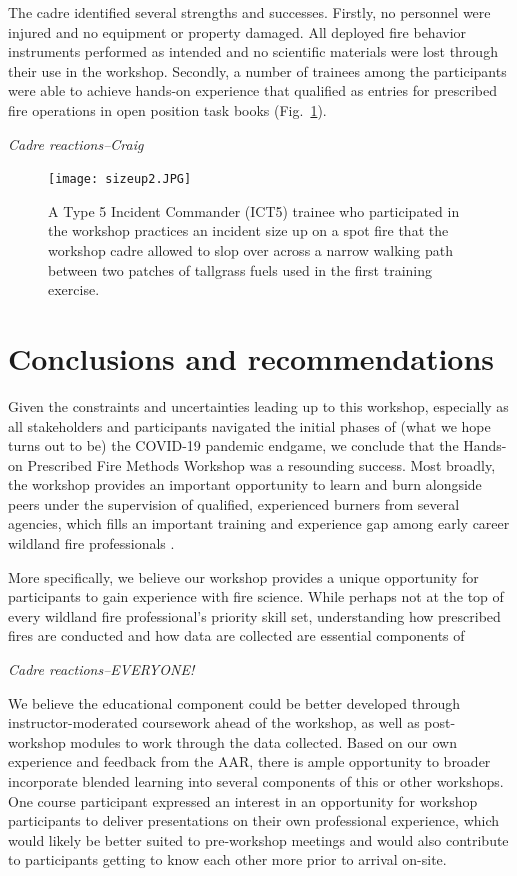 \documentclass[fire,article,submit,moreauthors,pdftex]{Definitions/mdpi}
\begin{document}
The cadre identified several strengths and successes.
Firstly, no personnel were injured and no equipment or property damaged.
All deployed fire behavior instruments performed as intended and no scientific materials were lost through their use in the workshop.
Secondly, a number of trainees among the participants were able to achieve hands-on experience that qualified as entries for prescribed fire operations in open position task books (Fig.~\ref{sizeup}).

\emph{Cadre reactions--Craig}

\begin{figure}
\centering
\texttt{[image: sizeup2.JPG]}
\caption{A Type 5 Incident Commander (ICT5) trainee who participated in the workshop practices an incident size up on a spot fire that the workshop cadre allowed to slop over across a narrow walking path between two patches of tallgrass fuels used in the first training exercise. \label{sizeup}}
\end{figure}

\hypertarget{conclusions-and-recommendations}{%
\section{Conclusions and recommendations}\label{conclusions-and-recommendations}}

Given the constraints and uncertainties leading up to this workshop, especially as all stakeholders and participants navigated the initial phases of (what we hope turns out to be) the COVID-19 pandemic endgame, we conclude that the Hands-on Prescribed Fire Methods Workshop was a resounding success.
Most broadly, the workshop provides an important opportunity to learn and burn alongside peers under the supervision of qualified, experienced burners from several agencies, which fills an important training and experience gap among early career wildland fire professionals \citep{kobziar2009}.

More specifically, we believe our workshop provides a unique opportunity for participants to gain experience with fire science.
While perhaps not at the top of every wildland fire professional's priority skill set, understanding how prescribed fires are conducted and how data are collected are essential components of

\emph{Cadre reactions--EVERYONE!}

We believe the educational component could be better developed through instructor-moderated coursework ahead of the workshop, as well as post-workshop modules to work through the data collected.
Based on our own experience and feedback from the AAR, there is ample opportunity to broader incorporate blended learning into several components of this or other workshops.
One course participant expressed an interest in an opportunity for workshop participants to deliver presentations on their own professional experience, which would likely be better suited to pre-workshop meetings and would also contribute to participants getting to know each other more prior to arrival on-site.
\end{document}
